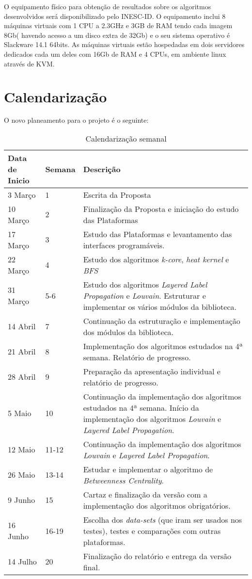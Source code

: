 O equipamento físico para obtenção de resultados sobre os algoritmos desenvolvidos será disponibilizado pelo INESC-ID. 
O equipamento inclui 8 máquinas virtuais com 1 CPU a 2.3GHz e 3GB de RAM tendo cada imagem 8Gb( havendo acesso a um disco extra de 32Gb) e o seu sistema operativo é Slackware 14.1 64bits.
As máquinas virtuais estão hospedadas em dois servidores dedicados cada um deles com 16Gb de RAM e 4 CPUs, em ambiente linux através de KVM.

\section{ Calendarização}
O novo planeamento para o projeto é o seguinte:
\begin{table}[H]
 \caption{ Calendarização semanal}
 \begin{tabular}{|l|l|p{9.5cm}|}
 \hline
 \bf{Data de Inicio} & \bf{Semana} & \bf{Descrição} \\ \hline
 3 Março & 1 & Escrita da Proposta \\ \hline
 10 Março & 2 & Finalização da Proposta e iniciação do estudo das Plataformas \\ \hline
 17 Março & 3 & Estudo das Plataformas e levantamento das interfaces programáveis. \\ \hline
 22 Março & 4 & Estudo dos algoritmos \textit{k-core}, \textit{heat kernel} e \textit{BFS}  \\ \hline
 31 Março & 5-6 & Estudo dos algoritmos \textit {Layered Label Propagation} e \textit{Louvain}. Estruturar e implementar os vários módulos da biblioteca.\\ \hline
 14 Abril & 7 & Continuação da estruturação e implementação dos módulos da biblioteca.\\ \hline
 21 Abril & 8 & Implementação dos algoritmos estudados na 4ª semana. Relatório de progresso.\\ \hline
 28 Abril & 9 & Preparação da apresentação individual e relatório de progresso. \\ \hline
 5 Maio & 10 & Continuação da implementação dos algoritmos estudados na 4ª semana. Início da implementação dos algoritmos \textit{Louvain} e \textit{Layered Label Propagation}. \\\hline
 12 Maio & 11-12 & Continuação da implementação dos algoritmos \textit{Louvain} e \textit{Layered Label Propagation}.\\ \hline
 26 Maio & 13-14 & Estudar e implementar o algoritmo de \textit{Betweenness Centrality}. \\ \hline
 9 Junho & 15 & Cartaz e finalização da versão com a implementação dos algoritmos obrigatórios. \\ \hline
 16 Junho & 16-19 & Escolha dos \textit{data-sets} (que iram ser usados nos testes), testes e comparações com outras plataformas. \\ \hline
 14 Julho & 20 & Finalização do relatório e entrega da versão final. \\ \hline
\end{tabular}
\end{table}
